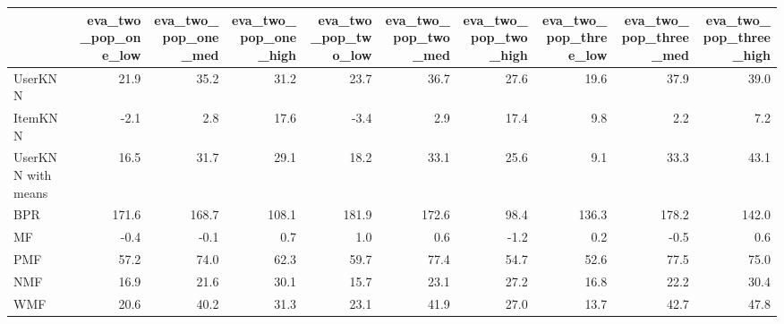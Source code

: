 \begin{tabular}{lrrrrrrrrr}
\toprule
{} &  eva\_two\_pop\_one\_low &  eva\_two\_pop\_one\_med &  eva\_two\_pop\_one\_high &  eva\_two\_pop\_two\_low &  eva\_two\_pop\_two\_med &  eva\_two\_pop\_two\_high &  eva\_two\_pop\_three\_low &  eva\_two\_pop\_three\_med &  eva\_two\_pop\_three\_high \\
\midrule
UserKNN            &                 21.9 &                 35.2 &                  31.2 &                 23.7 &                 36.7 &                  27.6 &                   19.6 &                   37.9 &                    39.0 \\
ItemKNN            &                 -2.1 &                  2.8 &                  17.6 &                 -3.4 &                  2.9 &                  17.4 &                    9.8 &                    2.2 &                     7.2 \\
UserKNN with means &                 16.5 &                 31.7 &                  29.1 &                 18.2 &                 33.1 &                  25.6 &                    9.1 &                   33.3 &                    43.1 \\
BPR                &                171.6 &                168.7 &                 108.1 &                181.9 &                172.6 &                  98.4 &                  136.3 &                  178.2 &                   142.0 \\
MF                 &                 -0.4 &                 -0.1 &                   0.7 &                  1.0 &                  0.6 &                  -1.2 &                    0.2 &                   -0.5 &                     0.6 \\
PMF                &                 57.2 &                 74.0 &                  62.3 &                 59.7 &                 77.4 &                  54.7 &                   52.6 &                   77.5 &                    75.0 \\
NMF                &                 16.9 &                 21.6 &                  30.1 &                 15.7 &                 23.1 &                  27.2 &                   16.8 &                   22.2 &                    30.4 \\
WMF                &                 20.6 &                 40.2 &                  31.3 &                 23.1 &                 41.9 &                  27.0 &                   13.7 &                   42.7 &                    47.8 \\

\end{tabular}
